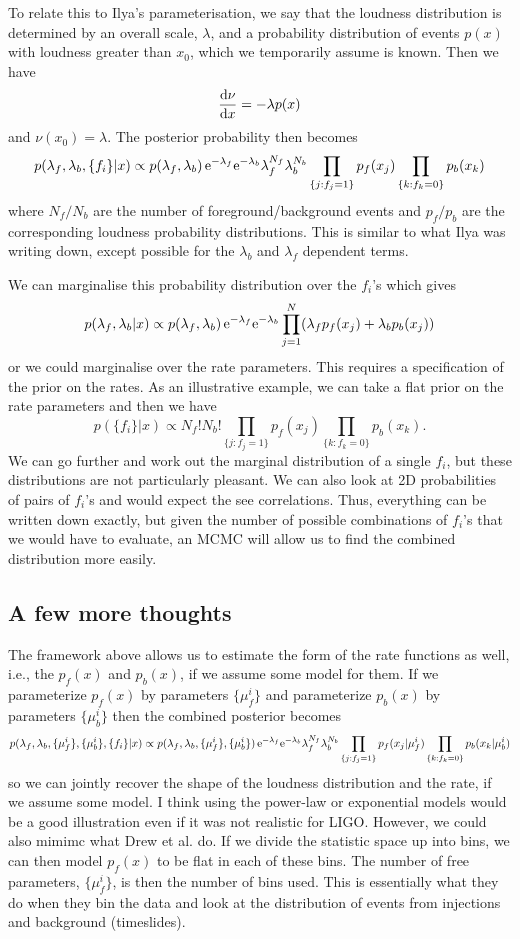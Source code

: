 \documentclass[prd,aps,eqsecnum]{revtex4}
\def\rmd{{\rm d}}
\def\be{\begin{equation}}
\def\ee{\end{equation}}
\def\rmd{{\rm d}}
\begin{document}
To relate this to Ilya's parameterisation, we say that the loudness distribution is determined by an overall scale, $\lambda$, and a probability distribution of events $p(x)$ with loudness greater than $x_0$, which we temporarily assume is known. Then we have 
\be
\frac{\rmd \nu}{\rmd x} = - \lambda p(x)
\ee
and $\nu(x_0) = \lambda$. The posterior probability then becomes
\be
p(\lambda_f, \lambda_b, \{f_i\} | x) \propto  p(\lambda_f, \lambda_b) \, {\rm e}^{-\lambda_f} {\rm e}^{-\lambda_b} \lambda_f^{N_f} \lambda_b^{N_b} \prod_{\{j :   f_j=1\}} p_f(x_j)\prod_{\{k : f_k=0\}} p_b(x_k)
\ee
where $N_f/N_b$ are the number of foreground/background events and $p_f/p_b$ are the corresponding loudness probability distributions. This is similar to what Ilya was writing down, except possible for the $\lambda_b$ and $\lambda_f$ dependent terms.

We can marginalise this probability distribution over the $f_i$'s which gives
\be
p(\lambda_f, \lambda_b | x) \propto p(\lambda_f, \lambda_b) \, {\rm e}^{-\lambda_f} {\rm e}^{-\lambda_b}  \prod_{j=1}^N (\lambda_f p_f(x_j) + \lambda_b p_b(x_j))
\ee
or we could marginalise over the rate parameters. This requires a specification of the prior on the rates. As an illustrative example, we can take a flat prior on the rate parameters and then we have
\be
p(\{f_i\} | x) \propto  N_f! N_b! \prod_{\{j :   f_j=1\}} p_f(x_j)\prod_{\{k : f_k=0\}} p_b(x_k).
\ee 
We can go further and work out the marginal distribution of a single $f_i$, but these distributions are not particularly pleasant. We can also look at 2D probabilities of pairs of $f_i$'s and would expect the see correlations. Thus, everything can be written down exactly, but given the number of possible combinations of $f_i$'s that we would have to evaluate, an MCMC will allow us to find the combined distribution more easily.

\subsection{A few more thoughts}
The framework above allows us to estimate the form of the rate functions as well, i.e., the $p_f(x)$ and $p_b(x)$, if we assume some model for them. If we parameterize $p_f(x)$ by parameters $\{\mu^i_f\}$ and parameterize $p_b(x)$ by parameters $\{\mu^i_b\}$ then the combined posterior becomes
\be
p(\lambda_f, \lambda_b, \{\mu_f^i\}, \{\mu_b^i\}, \{f_i\} | x) \propto  p(\lambda_f, \lambda_b, \{\mu_f^i\}, \{\mu_b^i\}) \, {\rm e}^{-\lambda_f} {\rm e}^{-\lambda_b} \lambda_f^{N_f} \lambda_b^{N_b} \prod_{\{j :   f_j=1\}} p_f(x_j | \mu_f^i)\prod_{\{k : f_k=0\}} p_b(x_k | \mu_b^i) \label{fullpost}
\ee
so we can jointly recover the shape of the loudness distribution and the rate, if we assume some model. I think using the power-law or exponential models would be a good illustration even if it was not realistic for LIGO. However, we could also mimimc what Drew et al. do. If we divide the statistic space up into bins, we can then model $p_f(x)$ to be flat in each of these bins. The number of free parameters, $\{\mu_f^i\}$, is then the number of bins used. This is essentially what they do when they bin the data and look at the distribution of events from injections and background (timeslides).
\end{document}
